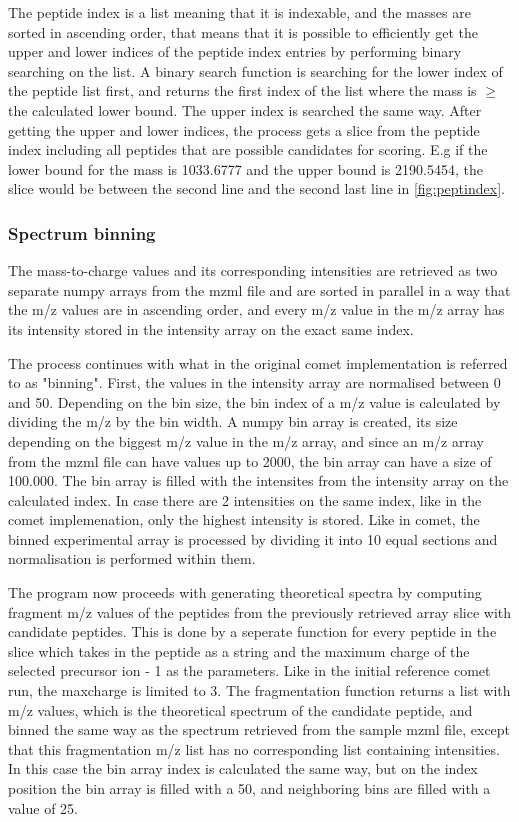 \documentclass[11pt]{article}
\begin{document}
The peptide index is a list meaning that it is indexable, and the masses are sorted in ascending order, that means that it is possible to efficiently get the upper and lower indices of the peptide index entries by performing binary searching on the list. A binary search function is searching for the lower index of the peptide list first, and returns the first index of the list where the mass is $\ge$ the calculated lower bound. The upper index is searched the same way. After getting the upper and lower indices, the process gets a slice from the peptide index including all peptides that are possible candidates for scoring. E.g if the lower bound for the mass is 1033.6777 and the upper bound is 2190.5454, the slice would be between the second line and the second last line in \cref{fig:peptindex}.


\subsubsection{Spectrum binning}
The mass-to-charge values and its corresponding intensities are retrieved as two separate numpy arrays from the mzml file and are sorted in parallel in a way that the m/z values are in ascending order, and every m/z value in the m/z array has its intensity stored in the intensity array on the exact same index.

The process continues with what in the original comet implementation is referred to as "binning". First, the values in the intensity array are normalised between 0 and 50. Depending on the bin size, the bin index of a m/z value is calculated by dividing the m/z by the bin width. A numpy bin array is created, its size depending on the biggest m/z value in the m/z array, and since an m/z array from the mzml file can have values up to 2000, the bin array can have a size of 100.000. The bin array is filled with the intensites from the intensity array on the calculated index. In case there are 2 intensities on the same index, like in the comet implemenation, only the highest intensity is stored. Like in comet, the binned experimental array is processed by dividing it into 10 equal sections and normalisation is performed within them.

The program now proceeds with generating theoretical spectra by computing fragment m/z values of the peptides from the previously retrieved array slice with candidate peptides. This is done by a seperate function for every peptide in the slice which takes in the peptide as a string and the maximum charge of the selected precursor ion - 1 as the parameters. Like in the initial reference comet run, the maxcharge is limited to 3. The fragmentation function returns a list with m/z values, which is the theoretical spectrum of the candidate peptide, and binned the same way as the spectrum retrieved from the sample mzml file, except that this fragmentation m/z list has no corresponding list containing intensities. In this case the bin array index is calculated the same way, but on the index position the bin array is filled with a 50, and neighboring bins are filled with a value of 25. 
\end{document}
